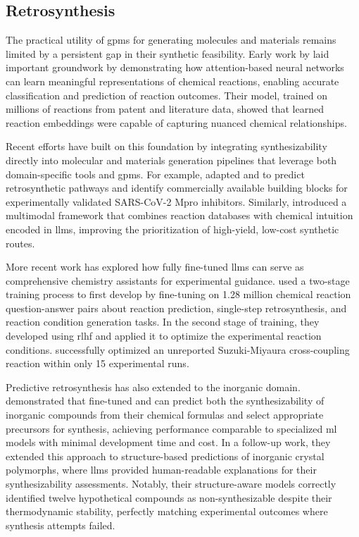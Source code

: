 \subsection{Retrosynthesis}\label{sec:retrosynthesis}

The practical utility of \glspl{gpm} for generating molecules and materials remains limited by a persistent gap in their synthetic feasibility. Early work by \textcite{schwaller2021mapping} laid important groundwork by demonstrating how attention-based neural networks can learn meaningful representations of chemical reactions, enabling accurate classification and prediction of reaction outcomes. Their model, trained on millions of reactions from patent and literature data, showed that learned reaction embeddings were capable of capturing nuanced chemical relationships. 

Recent efforts have built on this foundation by integrating synthesizability directly into molecular and materials generation pipelines that leverage both domain-specific tools and \glspl{gpm}. For example, \textcite{sun2025synllama} adapted  and  to predict retrosynthetic pathways and identify commercially available building blocks for experimentally validated SARS-CoV-2 Mpro inhibitors. 
Similarly, \textcite{liu2024multimodal} introduced a multimodal framework that combines reaction databases with chemical intuition encoded in \glspl{llm}, improving the prioritization of high-yield, low-cost synthetic routes.

More recent work has explored how fully fine-tuned \glspl{llm} can serve as comprehensive chemistry assistants for experimental guidance. \textcite{zhang2025large} used a two-stage training process to first develop  by fine-tuning  on 1.28 million chemical reaction question-answer pairs about reaction prediction, single-step retrosynthesis, and reaction condition generation tasks. 
In the second stage of training, they developed  using \gls{rlhf} and applied it to optimize the experimental reaction conditions.  successfully optimized an unreported Suzuki-Miyaura cross-coupling reaction within only 15 experimental runs.

Predictive retrosynthesis has also extended to the inorganic domain. \textcite{kim2024large} demonstrated that fine-tuned  and  can predict both the synthesizability of inorganic compounds from their chemical formulas and select appropriate precursors for synthesis, achieving performance comparable to specialized \gls{ml} models with minimal development time and cost. 
In a follow-up work, they extended this approach to structure-based predictions of inorganic crystal polymorphs, where \glspl{llm} provided human-readable explanations for their synthesizability assessments\autocite{kim2025explainable}. 
Notably, their structure-aware models correctly identified twelve hypothetical compounds as non-synthesizable despite their thermodynamic stability, perfectly matching experimental outcomes where synthesis attempts failed.

